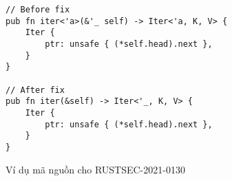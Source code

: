 \begin{listing}[H]
\begin{verbatim}
// Before fix
pub fn iter<'a>(&'_ self) -> Iter<'a, K, V> {
    Iter {
        ptr: unsafe { (*self.head).next },
    }
}

// After fix
pub fn iter(&self) -> Iter<'_, K, V> {
    Iter {
        ptr: unsafe { (*self.head).next },
    }
}
\end{verbatim}
\caption{Ví dụ mã nguồn cho RUSTSEC-2021-0130   }
\label{code:c4_RUSTSEC-2021-0130}
\end{listing}